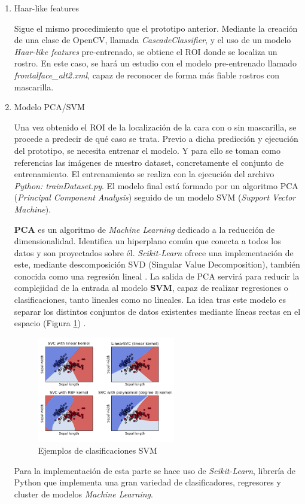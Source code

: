 \begin{enumerate}
	\item Haar-like features
	
	Sigue el mismo procedimiento que el prototipo anterior. Mediante la creación de una clase de OpenCV, llamada \textit{CascadeClassifier}, y el uso de un modelo \textit{Haar-like features} pre-entrenado, se obtiene el ROI donde se localiza un rostro. En este caso, se hará un estudio con el modelo pre-entrenado llamado \textit{frontalface\_alt2.xml}, capaz de reconocer de forma más fiable rostros con mascarilla. 
	
	\item Modelo PCA/SVM
	
	Una vez obtenido el ROI de la localización de la cara con o sin mascarilla, se procede a predecir de qué caso se trata. Previo a dicha predicción y ejecución del prototipo, se necesita entrenar el modelo. Y para ello se toman como referencias las imágenes de nuestro dataset, concretamente el conjunto de entrenamiento. El entrenamiento se realiza con la ejecución del archivo \textit{Python: trainDataset.py}. El modelo final está formado por un algoritmo PCA (\textit{Principal Component Analysis}) seguido de un modelo SVM (\textit{Support Vector Machine}).
	
	\textbf{PCA} es un algoritmo de \textit{Machine Learning} dedicado a la reducción de dimensionalidad. Identifica un hiperplano común que conecta a todos los datos y son proyectados sobre él. \textit{Scikit-Learn} ofrece una implementación de este, mediante descomposición SVD (Singular Value Decomposition), también conocida como una regresión lineal \cite{geron_2020}. La salida de PCA servirá para reducir la complejidad de la entrada al modelo \textbf{SVM}, capaz de realizar regresiones o clasificaciones, tanto lineales como no lineales. La idea tras este modelo es separar los distintos conjuntos de datos existentes mediante líneas rectas en el espacio (Figura \ref{fig:svm}) \cite{geron_2020}.
	
	\begin{figure}[htp]
		\centering
		\includegraphics[width=6cm]{imagenes/svm_example.png}
		\caption{Ejemplos de clasificaciones SVM}
		\label{fig:svm}
	\end{figure}

	Para la implementación de esta parte se hace uso de \textit{Scikit-Learn}, librería de Python que implementa una gran variedad de clasificadores, regresores y cluster de modelos \textit{Machine Learning}.
\end{enumerate}

